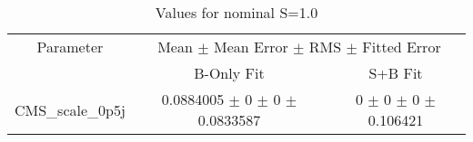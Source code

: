 \begin{table}
\centering
\caption{Values for nominal S=1.0}
\begin{tabular}{ccc}
\toprule
Parameter 	& \multicolumn{2}{c}{Mean $\pm$ Mean Error $\pm$ RMS $\pm$ Fitted Error}\\
 	& B-Only Fit & S+B Fit\\
\midrule
CMS\_scale\_0p5j 	& \num{0.0884005} $\pm$ \num{0} $\pm$ \num{0} $\pm$ \num{0.0833587} 	& \num{0} $\pm$ \num{0} $\pm$ \num{0} $\pm$ \num{0.106421}\\
\bottomrule
\end{tabular}
\end{table}